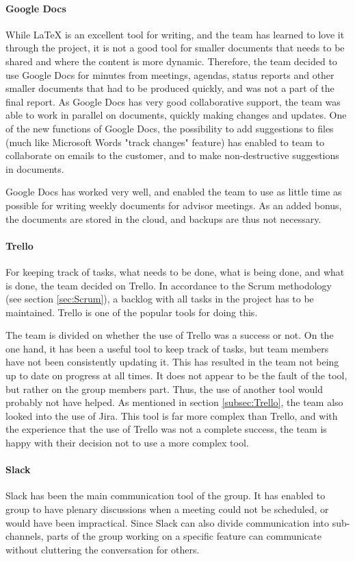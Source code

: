 \documentclass[11pt,a4paper,titlepage,oneside]{report}
\begin{document}
\paragraph{Google Docs}
While \LaTeX{} is an excellent tool for writing, and the team has learned to love it through the project, it is not a good tool for smaller documents that needs to be shared and where the content is more dynamic. Therefore, the team decided to use Google Docs for minutes from meetings, agendas, status reports and other smaller documents that had to be produced quickly, and was not a part of the final report. As Google Docs has very good collaborative support, the team was able to work in parallel on documents, quickly making changes and updates. One of the new functions of Google Docs, the possibility to add suggestions to files (much like Microsoft Words "track changes" feature) has enabled to team to collaborate on emails to the customer, and to make non-destructive suggestions in documents.


Google Docs has worked very well, and enabled the team to use as little time as possible for writing weekly documents for advisor meetings. As an added bonus, the documents are stored in the cloud, and backups are thus not necessary. 

\paragraph{Trello}
For keeping track of tasks, what needs to be done, what is being done, and what is done, the team decided on Trello. In accordance to the Scrum methodology (see section \ref{sec:Scrum}), a backlog with all tasks in the project has to be maintained. Trello is one of the popular tools for doing this. 

The team is divided on whether the use of Trello was a success or not. On the one hand, it has been a useful tool to keep track of tasks, but team members have not been consistently updating it. This has resulted in the team not being up to date on progress at all times. It does not appear to be the fault of the tool, but rather on the group members part. Thus, the use of another tool would probably not have helped. As mentioned in section \ref{subsec:Trello}, the team also looked into the use of Jira. This tool is far more complex than Trello, and with the experience that the use of Trello was not a complete success, the team is happy with their decision not to use a more complex tool. 

\paragraph{Slack}
Slack has been the main communication tool of the group. It has enabled to group to have plenary discussions when a meeting could not be scheduled, or would have been impractical. Since Slack can also divide communication into sub-channels, parts of the group working on a specific feature can communicate without cluttering the conversation for others.
\end{document}
